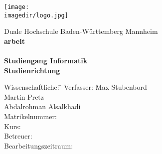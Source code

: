 \begin{titlepage}
	\begin{minipage}{\textwidth}
		\vspace{-2cm}
 \texttt{[image: \\imagedir/logo.jpg]}
	\end{minipage}
	\vspace{1em}
	\begin{center}
		{\textsf{\large Duale Hochschule Baden-W\"urttemberg Mannheim}}\\[4em]
		{\textsf{\textbf{\large{\DieArtDerArbeit}arbeit}}}\\[6mm]
		{\textsf{\textbf{\Large{}\DerTitelDerArbeit}}} \\[1.5cm]
		{\textsf{\textbf{\large{}Studiengang Informatik}}\\[6mm]
		\textsf{\textbf{Studienrichtung \DieStudienrichtung}}}\vspace{10em}

		\begin{minipage}{\textwidth}
			\begin{tabbing}
				Wissenschaftliche: \hspace{0.85cm}\=\kill
				Verfasser: \> Max Stubenbord \\ \>  Martin Pretz \\ \> Abdalrohman Alsalkhadi\\[1.5mm]
				Matrikelnummer: \> \DieMatrikelnummer \\[1.5mm]
				Kurs: \> \DieKursbezeichnung \\[1.5mm]
				Betreuer: \> \DerStudiengangsleiter \\[1.5mm]
				Bearbeitungszeitraum: \> \DerBearbeitungszeitraum\\[1.5mm]
			\end{tabbing}
		\end{minipage}
	\end{center}
\end{titlepage}
